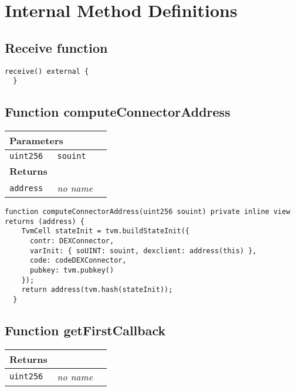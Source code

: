 \section{Internal Method Definitions}


\subsection{Receive function}

\vspace{2cm}

\begin{lstlisting}[firstnumber=413]
  receive() external {
  }
\end{lstlisting}

\subsection{Function computeConnectorAddress}


\ifsoltables
\noindent\begin{tabular}{|l|l|p{5cm}|}\hline
\multicolumn{3}{|l|}{\bf Parameters}\\\hline
\tt uint256 & \tt souint &\\\hline
\multicolumn{3}{|l|}{\bf Returns}\\\hline
\tt address & {\em no name} &\\\hline
\end{tabular}
\fi

\vspace{2cm}

\begin{lstlisting}[firstnumber=142]
  function computeConnectorAddress(uint256 souint) private inline view returns (address) {
    TvmCell stateInit = tvm.buildStateInit({
      contr: DEXConnector,
      varInit: { soUINT: souint, dexclient: address(this) },
      code: codeDEXConnector,
      pubkey: tvm.pubkey()
    });
    return address(tvm.hash(stateInit));
  }
\end{lstlisting}

\subsection{Function getFirstCallback}


\ifsoltables
\noindent\begin{tabular}{|l|l|p{5cm}|}\hline
\multicolumn{3}{|l|}{\bf Returns}\\\hline
\tt uint256 & {\em no name} &\\\hline
\end{tabular}
\fi

